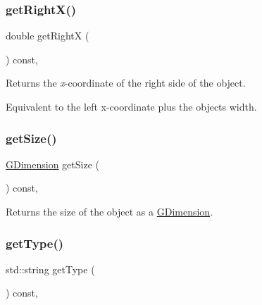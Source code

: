 \subsubsection{\texorpdfstring{get\+Right\+X()}{getRightX()}}
{\footnotesize\ttfamily double get\+RightX (\begin{DoxyParamCaption}{ }\end{DoxyParamCaption}) const\hspace{0.3cm}{\ttfamily [virtual]}, {\ttfamily [inherited]}}



Returns the {\itshape x}-\/coordinate of the right side of the object. 

Equivalent to the left x-\/coordinate plus the object\textquotesingle{}s width. \mbox{\label{classsgl_1_1GObject_a7b4eec96a2bdc6420695d5796a78eea9}} 
\subsubsection{\texorpdfstring{get\+Size()}{getSize()}}
{\footnotesize\ttfamily \mbox{\hyperlink{structsgl_1_1GDimension}{G\+Dimension}} get\+Size (\begin{DoxyParamCaption}{ }\end{DoxyParamCaption}) const\hspace{0.3cm}{\ttfamily [virtual]}, {\ttfamily [inherited]}}



Returns the size of the object as a {\ttfamily \mbox{\hyperlink{structsgl_1_1GDimension}{G\+Dimension}}}. 

\mbox{\label{classsgl_1_1GRoundRect_a9b72ede4ee8520f987a0c01e30654814}} 
\subsubsection{\texorpdfstring{get\+Type()}{getType()}}
{\footnotesize\ttfamily std\+::string get\+Type (\begin{DoxyParamCaption}{ }\end{DoxyParamCaption}) const\hspace{0.3cm}{\ttfamily [override]}, {\ttfamily [virtual]}}



